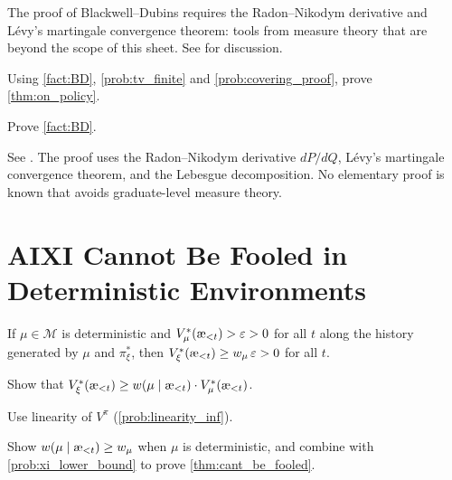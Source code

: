 \documentclass[fontsize=11pt, parskip=half]{scrartcl}
\newcommand{\cM}{\mathcal{M}}
\newcommand{\aes}{\textnormal{\ae}}
\begin{document}
The proof of Blackwell--Dubins requires the Radon--Nikodym derivative and L\'{e}vy's martingale convergence theorem: tools from measure theory that are beyond the scope of this sheet.
See \cite[Chapter~3.9]{Hutter:24uaibook2} for discussion.

\begin{exercise}
\label{prob:on_policy_proof}
Using \cref{fact:BD}, \cref{prob:tv_finite} and \cref{prob:covering_proof}, prove \cref{thm:on_policy}.

\end{exercise}


\begin{exercise}
\label{prob:auto4}
\skippable
Prove \cref{fact:BD}.


\begin{hint}
See \cite{Blackwell:62}. The proof uses the Radon--Nikodym derivative $dP/dQ$, L\'{e}vy's martingale convergence theorem, and the Lebesgue decomposition.
No elementary proof is known that avoids graduate-level measure theory.
\end{hint}


\end{exercise}

\section{AIXI Cannot Be Fooled in Deterministic Environments}\label{prob:cant_be_fooled}

\begin{theorem}\label{thm:cant_be_fooled}
If $\mu \in \cM$ is deterministic and $V_\mu^*(\aes_{<t}) > \varepsilon > 0$ for all $t$ along the history generated by $\mu$ and $\pi_\xi^*$, then $V_\xi^*(\aes_{<t}) \geq w_\mu\, \varepsilon > 0$ for all $t$. \cite[Theorem 7.4.10]{Hutter:24uaibook2}
\end{theorem}

\begin{exercise}
\label{prob:xi_lower_bound}
Show that $V_\xi^*(\aes_{<t}) \geq w(\mu \mid \aes_{<t}) \cdot V_\mu^*(\aes_{<t})$.


\begin{hint}
Use linearity of $V^\pi$ (\cref{prob:linearity_inf}).
\end{hint}
\end{exercise}


\begin{exercise}
\label{prob:auto5}
Show $w(\mu \mid \aes_{<t}) \geq w_\mu$ when $\mu$ is deterministic, and combine with \cref{prob:xi_lower_bound} to prove \cref{thm:cant_be_fooled}.

\end{exercise}
\end{document}
